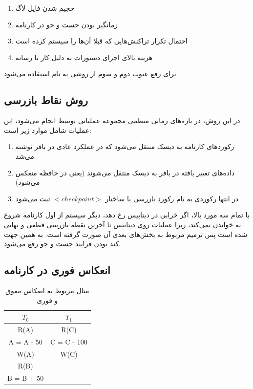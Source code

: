 \begin{enumerate}
    \item حجیم شدن فایل لاگ
    \item زمانگیر بودن جست و جو در کارنامه 
    \item احتمال تکرار تراکنش‌هایی که قبلا آن‌ها را سیستم  کرده است
    \item هزینه‌ بالای اجرای دستورات به دلیل کار با رسانه
\end{enumerate}

برای رفع عیوب دوم و سوم از روشی به نام  استفاده می‌شود.

\subsection{روش نقاط بازرسی}

در این روش، در بازه‌های زمانی منظمی مجموعه عملیاتی توسط  انجام می‌شود،
این عملیات شامل موارد زیر است:

\begin{enumerate}
    \item رکورد‌های کارنامه به دیسک منتقل می‌شود که در عملکرد عادی در بافر نوشته
    می‌شد
    \item داده‌های تغییر یافته در بافر به دیسک منتقل می‌شوند (یعنی در حافظه منعکس می‌شود)
    \item در انتها رکوردی به نام رکورد بازرسی با ساختار $<checkpoint>$ ثبت
    می‌شود
\end{enumerate}

با تمام سه مورد بالا، اگر خرابی در دیتابیس رخ دهد، دیگر سیستم از اول کارنامه
شروع به خواندن نمی‌کند، زیرا عملیات روی دیتابیس تا آخرین نقطه بازرسی قطعی و
نهایی شده است پس ترمیم مربوط به بخش‌های بعدی آن صورت گرفته است. به همین جهت کند
بودن فرایند جست و جو رفع می‌شود.

\subsection*{انعکاس فوری در کارنامه}

\begin{LTR}
    \begin{table}[h]
        \centering
        \begin{RTL}
            \caption{مثال مربوط به انعکاس معوق و فوری}
        \end{RTL}
        \begin{tabular}{c|c}
            $T_0$ & $T_1$ \\ \hline
            R(A) & R(C) \\
            A = A - 50 & C = C - 100 \\
            W(A) & W(C) \\
            R(B) &  \\
            B = B + 50 &  \\
        \end{tabular}
    \end{table}
\end{LTR}

